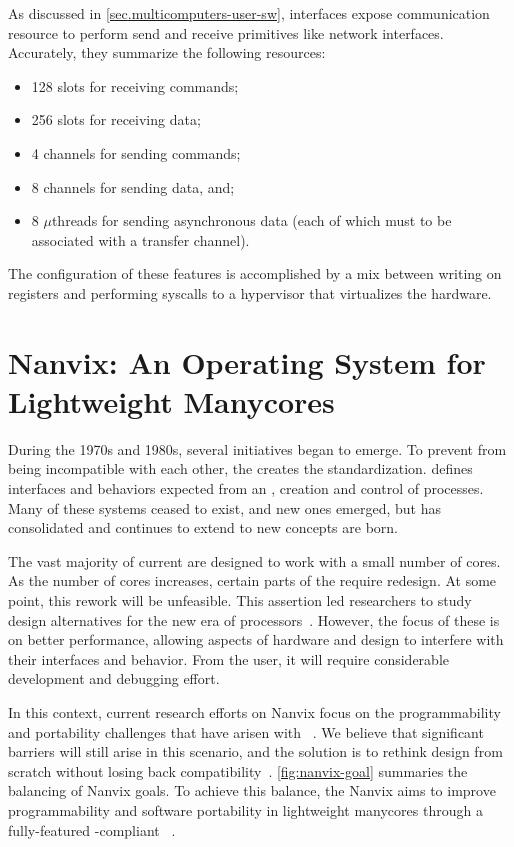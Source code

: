	As discussed in \autoref{sec.multicomputers-user-sw}, \noc interfaces
	expose communication resource to perform send and receive primitives
	like network interfaces.
	Accurately, they summarize the following resources:

	\begin{itemize}
		\item 128 slots for receiving commands;
		\item 256 slots for receiving data;
		\item 4 channels for sending commands;
		\item 8 channels for sending data, and;
		\item 8 $\mu$threads for sending asynchronous data (each of which must
			to be associated with a transfer channel).
	\end{itemize}

	The configuration of these features is accomplished by a mix between
	writing on \dma registers and performing syscalls to a hypervisor
	that virtualizes the \mppa hardware.

\section{Nanvix: An Operating System for Lightweight Manycores}
\label{sec.nanvix}

	During the 1970s and 1980s, several \os initiatives began to emerge.
	To prevent \oss from being incompatible with each other, the \ieee creates
	the \posix standardization.
	\posix defines interfaces and behaviors expected from an \os, \eg creation
	and control of processes.
	Many of these systems ceased to exist, and new ones emerged, but \posix has
	consolidated and continues to extend to new concepts are born.

	The vast majority of current \oss are designed to work with a small number of cores.
	As the number of cores increases, certain parts of the \os require redesign.
	At some point, this rework will be unfeasible.
	This assertion led researchers to study design alternatives for the new era
	of processors~\cite{wentzlaff_factored_2009, Wisniewski2014}.
	However, the focus of these \oss is on better performance, allowing aspects
	of hardware and design to interfere with their interfaces and behavior.
	From the user, it will require considerable development and debugging effort.

	In this context, current research efforts on Nanvix \os focus on the
	programmability and portability	challenges that have arisen with
	\lightweight \manycores~\cite{christgau2017, gamell2012, serres2011}.
	We believe that significant barriers will still arise in this scenario, and
	the solution is to rethink \os design from scratch without losing back
	compatibility~\cite{penna:compas19, penna2019}.
	\autoref{fig:nanvix-goal} summaries the balancing of Nanvix \os goals.
	To achieve this balance, the Nanvix \os aims to improve programmability
	and software portability in lightweight manycores through a fully-featured
	\posix-compliant \os~\cite{penna:compas19}.

